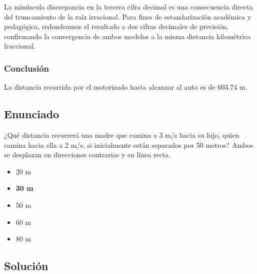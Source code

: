 \documentclass[12pt, a4paper]{article}
\begin{document}
La minúscula discrepancia en la tercera cifra decimal es una consecuencia directa del truncamiento de la raíz irracional. Para fines de estandarización académica y pedagógica, redondeamos el resultado a dos cifras decimales de precisión, confirmando la convergencia de ambos modelos a la misma distancia kilométrica fraccional.

\subsubsection*{Conclusión}

La distancia recorrida por el motorizado hasta alcanzar al auto es de 603.74 m.

\newpage

\subsection*{Enunciado}

¿Qué distancia recorrerá una madre que camina a 3 m/s hacia su hijo, quien camina hacia ella a 2 m/s, si inicialmente están separados por 50 metros? Ambos se desplazan en direcciones contrarias y en línea recta.

\begin{itemize}
    \item[a)] 20 m
    \item[b)] \textbf{30 m}
    \item[c)] 50 m
    \item[d)] 60 m
    \item[e)] 80 m
\end{itemize}

\vspace{0.5cm}

\begin{center}
\end{center}

\subsection*{Solución}
\end{document}
